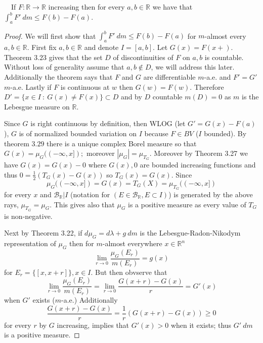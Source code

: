 \documentclass[11pt]{amsart}
\theoremstyle{definition}
\numberwithin{theorem}{section}
\numberwithin{definition}{section}
\numberwithin{equation}{section}
\def\scriptb{{\mathcal B}}
\begin{document}
 \medskip {}\ \ If $F: \mathbb{R} \to \mathbb{R}$ increasing then for every 
 $a,b \in \mathbb{R}$ we have that $\int_a^b F'\ dm \leq F(b) - F(a).$
 \begin{proof}
 	We will first show that $\int_a^b F'\ dm \leq F(b) - F(a)$ for $m$-almost every $a,b \in \mathbb{R}.$ First fix $a,b 
 	\in \mathbb{R}$ and denote $I = [a,b]$. Let $G(x) = F(x+).$ Theorem $3.23$ gives that the set $D$ of discontinuities of $F$ on $a,b$ is countable. 
 	Without loss of generality assume that $a,b \notin D$, we will address this later. Additionally the theorem says that $F$ and $G$ are differentiable $m$-a.e. and $F' = G'$ $m$-a.e. Lastly if $F$ is continuous at $w$ then $G(w) = F(w).$ Therefore $D' = \{x \in I\ :\ G(x) \neq F(x)\} \subset D$ and by $D$ countable $m(D) = 0$ as $m$ is the Lebesgue measure on $\mathbb{R}$.

 	Since $G$ is right continuous by definition, then WLOG (let $G' = G(x) - F(a)$), $G$ is of normalized bounded variation on $I$ because $F \in BV$ ($I $ bounded). By theorem $3.29$ there is a unique complex Borel measure so that $G(x) = \mu_G((-\infty, x]);$ moreover $|\mu_G| = \mu_{T_G}.$ Moreover by Theorem 3.27 we have $G(x) = G(x) - 0$ where $G(x), 0$ are bounded increasing functions and thus $0 = \frac{1}{2}(T_G(x) - G(x))$ so $T_G(x) = G(x)$. Since 
 	$$\mu_G((-\infty, x]) = G(x) = T_G(X) =  \mu_{T_G}((-\infty, x])$$ for every $x$
 	and $\scriptb_\mathbb{R} | I $ (notation for $(E \in \scriptb_\mathbb{R}, E \subset I)$) is generated by the above rays, $\mu_{T_G} = \mu_G.$ This gives also that $\mu_G$ is a positive measure
 	as every value of $T_G$ is non-negative.

 	Next by Theorem 3.22, if $d\mu_G = d \lambda +  g\ dm$ is the Lebesgue-Radon-Nikodym representation of $\mu_G$ then for $m$-almost everywhere $x \in \mathbb{R}^n$
 	\begin{equation*}
 		\lim_{r \to 0} \frac{\mu_G(E_r)}{m(E_r)} = g(x)
 	\end{equation*}
 	for $E_r = \{[x, x+r]\}, x \in I.$ But then obvserve that
 	\begin{equation*}
 		\lim_{r \to 0} \frac{\mu_G(E_r)}{m(E_r)} =  \lim_{r \to 0}\frac{G(x+r) - G(x)}{r} = G'(x)
 	\end{equation*}
 	when $G'$ exists ($m$-a.e.) Additionally 
 	\begin{equation*}
 	 	\frac{G(x +r) - G(x)}{r} = \frac{1}{r}\left(G(x +r) - G(x)\right) \geq 0
 	 \end{equation*} 
 	 for every $r$ by $G$ increasing, implies that $G'(x) > 0$ when it exists; thus $G'\ dm$ is a positive measure.


\end{proof}
\end{document}
